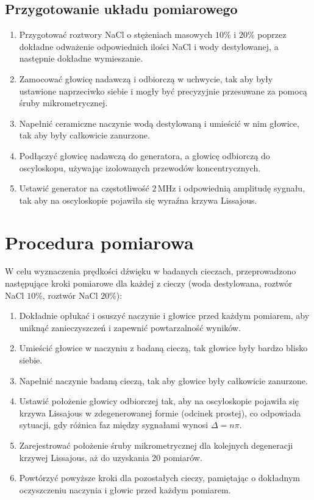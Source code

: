 \documentclass[12pt, a4paper]{article}
\begin{document}
\subsection{Przygotowanie układu pomiarowego}
\begin{enumerate}
    \item Przygotować roztwory NaCl o stężeniach masowych $10\%$ i $20\%$ poprzez dokładne odważenie odpowiednich ilości NaCl i wody destylowanej, a następnie dokładne wymieszanie.
    \item Zamocować głowicę nadawczą i odbiorczą w uchwycie, tak aby były ustawione naprzeciwko siebie i mogły być precyzyjnie przesuwane za pomocą śruby mikrometrycznej.
    \item Napełnić ceramiczne naczynie wodą destylowaną i umieścić w nim głowice, tak aby były całkowicie zanurzone.
    \item Podłączyć głowicę nadawczą do generatora, a głowicę odbiorczą do oscyloskopu, używając izolowanych przewodów koncentrycznych.
    \item Ustawić generator na częstotliwość $2\,\mathrm{MHz}$ i odpowiednią amplitudę sygnału, tak aby na oscyloskopie pojawiła się wyraźna krzywa Lissajous.
\end{enumerate}

\section{Procedura pomiarowa}
W celu wyznaczenia prędkości dźwięku w badanych cieczach, przeprowadzono następujące kroki pomiarowe dla każdej z cieczy (woda destylowana, roztwór NaCl $10\%$, roztwór NaCl $20\%$):
\begin{enumerate}
    \item Dokładnie opłukać i osuszyć naczynie i głowice przed każdym pomiarem, aby uniknąć zanieczyszczeń i zapewnić powtarzalność wyników.
    \item Umieścić głowice w naczyniu z badaną cieczą, tak głowice były bardzo blisko siebie.
    \item Napełnić naczynie badaną cieczą, tak aby głowice były całkowicie zanurzone.
    \item Ustawić położenie głowicy odbiorczej tak, aby na oscyloskopie pojawiła się krzywa Lissajous w zdegenerowanej formie (odcinek prostej), co odpowiada sytuacji, gdy różnica faz między sygnałami wynosi $\Delta = n\pi$.
    \item Zarejestrować położenie śruby mikrometrycznej dla kolejnych degeneracji krzywej Lissajous, aż do uzyskania 20 pomiarów.
    \item Powtórzyć powyższe kroki dla pozostałych cieczy, pamiętając o dokładnym oczyszczeniu naczynia i głowic przed każdym pomiarem.
\end{enumerate}
\end{document}
